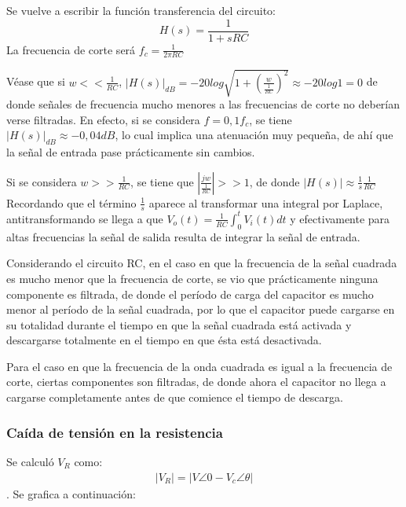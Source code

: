 \documentclass[11pt, a4paper]{article}
\begin{document}
Se vuelve a escribir la función transferencia del circuito: \begin{equation*}
    H(s)=\frac{1}{1+sRC}
\end{equation*}
La frecuencia de corte será $f_c=\frac{1}{2\pi RC}$

Véase que si $w<<\frac{1}{RC}$, $|H(s)|_{dB}=-20log\sqrt{1+(\frac{w}{\frac{1}{RC}})^2}\approx-20log1=0$ de donde señales de frecuencia mucho menores a las frecuencias de corte no deberían verse filtradas. En efecto, si se considera $f=0,1f_c$, se tiene $|H(s)|_{dB}\approx-0,04dB$, lo cual implica una atenuación muy pequeña, de ahí que la señal de entrada pase prácticamente sin cambios.

Si se considera $w>>\frac{1}{RC}$, se tiene que $|\frac{jw}{\frac{1}{RC}}|>>1$, de donde $|H(s)|\approx\frac{1}{s}\frac{1}{RC}$ Recordando que el término $\frac{1}{s}$ aparece al transformar una integral por Laplace, antitransformando se llega a que $V_o(t)=\frac{1}{RC}\int_{0}^{t}V_i(t)dt $ y efectivamente para altas frecuencias la señal de salida resulta de integrar la señal de entrada.

Considerando el circuito RC, en el caso en que la frecuencia de la señal cuadrada es mucho menor que la frecuencia de corte, se vio que prácticamente ninguna componente es filtrada, de donde el período de carga del capacitor es mucho menor al período de la señal cuadrada, por lo que el capacitor puede cargarse en su totalidad durante el tiempo en que la señal cuadrada está activada y descargarse totalmente en el tiempo en que ésta está desactivada.

Para el caso en que la frecuencia de la onda cuadrada es igual a la frecuencia de corte, ciertas componentes son filtradas, de donde ahora el capacitor no llega a cargarse completamente antes de que comience el tiempo de descarga.


\subsubsection*{Caída de tensión en la resistencia}

Se calculó $V_R$  como:
\begin{align}
|V_R| = |V\angle0 - V_c\angle{\theta}|
 \end{align}
. Se grafica a continuación:
\end{document}
